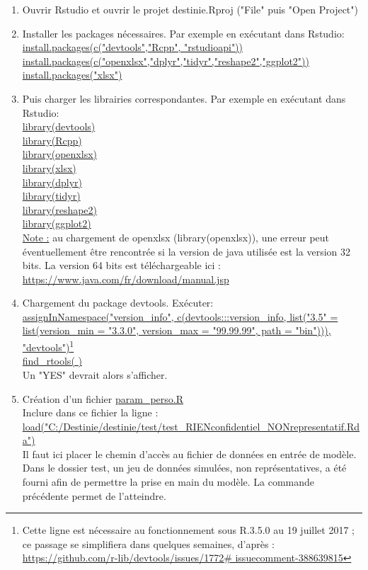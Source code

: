 \begin{enumerate}
\item Ouvrir Rstudio et ouvrir le projet destinie.Rproj ("File" puis "Open Project")

\item Installer les packages nécessaires.
Par exemple en exécutant dans Rstudio:\\
\url{install.packages(c("devtools","Rcpp", "rstudioapi"))}\\ \url{install.packages(c("openxlsx","dplyr","tidyr","reshape2","ggplot2"))}\\  
\url{install.packages("xlsx")}\\

\item Puis charger les librairies correspondantes.
Par exemple en exécutant dans Rstudio:\\
    \url{library(devtools)} \\
    \url{library(Rcpp)} \\
    \url{library(openxlsx)} \\
    \url{library(xlsx)} \\
    \url{library(dplyr)} \\
    \url{library(tidyr)} \\
    \url{library(reshape2)} \\
    \url{library(ggplot2)} \\
\underline{Note :} au chargement de openxlsx (library(openxlsx)), une erreur peut éventuellement être rencontrée si la version de java utilisée est la version 32 bits. La version 64 bits est téléchargeable ici : \url{https://www.java.com/fr/download/manual.jsp}\\

\item Chargement du package devtools. Exécuter: \\
 \url{assignInNamespace("version_info", c(devtools:::version_info, list("3.5" = list(version_min = "3.3.0", version_max = "99.99.99", path = "bin"))), "devtools")}\footnote{Cette ligne est nécessaire au fonctionnement sous R.3.5.0 au 19 juillet 2017 ; ce passage se simplifiera dans quelques semaines, d’après : \url{https://github.com/r-lib/devtools/issues/1772\# issuecomment-388639815}}  \\
 
 \url{find_rtools( )}  \\
 Un "YES" devrait alors s'afficher.
 
 \item Création d'un fichier \url{param_perso.R} \\
Inclure dans ce fichier la ligne : \\
\url{load("C:/Destinie/destinie/test/test_RIENconfidentiel_NONrepresentatif.Rda")}\\
Il faut ici placer le chemin d'accès au fichier de données en entrée de modèle. Dans le dossier test, un jeu de données simulées, non représentatives, a été fourni afin de permettre la prise en main du modèle. La commande précédente permet de l'atteindre.\\


\end{enumerate}
